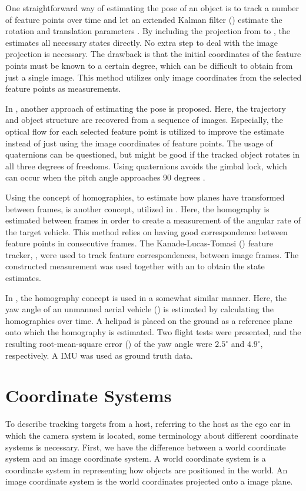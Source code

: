 One straightforward way of estimating the  pose of an object is to track a number of feature points over time and let an extended Kalman filter (\abbrEKF) estimate the rotation and translation parameters \cite{Hajimolahoseini:2014}.
By including the projection from  to , the \abbrEKF estimates all necessary states directly.
No extra step to deal with the image projection is necessary.
The drawback is that the initial  coordinates of the feature points must be known to a certain degree, which can be difficult to obtain from just a single image.
This method utilizes only image coordinates from the selected feature points as measurements.

In \cite{Blostein:2000}, another approach of estimating the  pose is proposed.
Here, the  trajectory and object structure are recovered from a sequence of images.
Especially, the optical flow for each selected feature point is utilized to improve the estimate instead of just using the image coordinates of feature points.
The usage of quaternions can be questioned, but might be good if the tracked object rotates in all three degrees of freedoms.
Using quaternions avoids the gimbal lock, which can occur when the pitch angle approaches 90 degrees \cite{Gustafsson:2012}.

Using the concept of homographies, \ie to estimate how planes have transformed between frames, is another concept, utilized in \cite{Gabb:2013}.
Here, the homography is estimated between frames in order to create a measurement of the angular rate of the target vehicle.
This method relies on having good correspondence between feature points in consecutive frames.
The Kanade-Lucas-Tomasi (\abbrKLT) feature tracker, \eg \cite{Szeliski:2011}, were used to track feature correspondences, between image frames.
The constructed measurement was used together with an \abbrEKF to obtain the state estimates.

In \cite{Mondragon:2010}, the homography concept is used in a somewhat similar manner.
Here, the yaw angle of an unmanned aerial vehicle (\abbrUAV) is estimated by calculating the homographies over time.
A helipad is placed on the ground as a reference plane onto which the homography is estimated.
Two flight tests were presented, and the resulting root-mean-square error (\abbrRMSE) of the yaw angle were $2.5^\circ$ and $4.9^\circ$, respectively.
A IMU was used as ground truth data.

\section{Coordinate Systems}
To describe tracking targets from a host, referring to the host as the ego car in which the camera system is located, some terminology about different coordinate systems is necessary.
First, we have the difference between a world coordinate system  and an image coordinate system.
A world coordinate system is a coordinate system in  representing how objects are positioned in the world.
An image coordinate system is the  world coordinates projected onto a  image plane.

